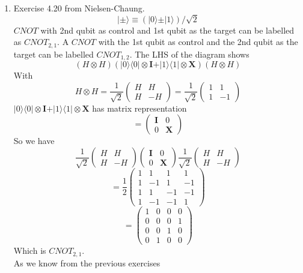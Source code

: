 \documentclass[12pt]{article}
\newcommand{\ket}[1]{\vert{#1}\rangle}
\newcommand{\bra}[1]{\langle{#1}\vert}
\begin{document}
\begin{enumerate}
    \item Exercise 4.20 from Nielsen-Chaung. 
    $$ \ket{\pm} \equiv (\ket{0} \pm \ket{1}) / \sqrt{2} $$
    $CNOT $ with 2nd qubit as control and 1st qubit as the target can be labelled as $CNOT_{2,1}$. A $CNOT$ with the 1st qubit as control and the 2nd qubit as the target can be labelled $CNOT_{1,2}$. The LHS of the diagram shows 
    $$ (H \otimes H) (\ket{0} \bra{0} \otimes \textbf{I} + \ket{1} \bra{1} \otimes \textbf{X}) (H \otimes H) $$
    With 
    $$ H \otimes H = \frac{1}{\sqrt{2}} \left(\begin{array}{cc} H & H \\  H & -H\end{array}\right) =\frac{1}{\sqrt{2}} \left(\begin{array}{cc} 1 & 1 \\  1 & -1\end{array}\right) $$
    $\ket{0}\bra{0} \otimes \textbf{I} + \ket{1}\bra{1} \otimes \textbf{X}$ has matrix representation 
    $$ =  \left(\begin{array}{cc} \textbf{I} & 0 \\  0 & \textbf{X} \end{array}\right)$$
    So we have 
    $$ \frac{1}{\sqrt{2}} \left(\begin{array}{cc} H & H \\  H & -H\end{array}\right)\left(\begin{array}{cc} \textbf{I} & 0 \\  0 & \textbf{X} \end{array}\right)\frac{1}{\sqrt{2}} \left(\begin{array}{cc} H & H \\  H & -H\end{array}\right) $$
    $$ = \frac{1}{2} \left(\begin{array}{cccc} 1 & 1 & 1 & 1 \\  1 & -1 & 1 & -1 \\ 1 & 1 & -1 & -1 \\ 1 & -1 & -1 & 1\end{array}\right) $$
    $$ =  \left(\begin{array}{cccc} 1 & 0 & 0 & 0 \\  0 & 0 & 0 & 1 \\ 0 & 0 & 1 & 0 \\ 0 & 1 & 0 & 0\end{array}\right) $$
    Which is $CNOT_{2,1}$. 
    \\ 
    As we know from the previous exercises 

\end{enumerate}
\end{document}
